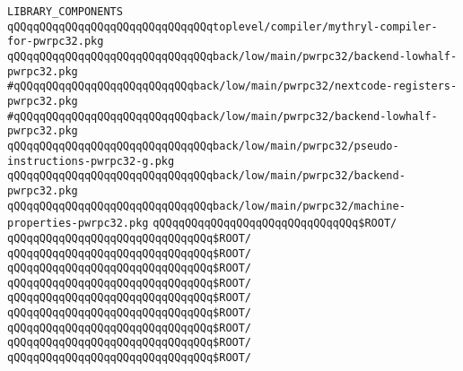 \verb|LIBRARY_COMPONENTS|\newline
\newline
\verb|qQQqqQQqqQQqqQQqqQQqqQQqqQQqqQQqtoplevel/compiler/mythryl-compiler-for-pwrpc32.pkg|\newline
\newline
\verb|qQQqqQQqqQQqqQQqqQQqqQQqqQQqqQQqback/low/main/pwrpc32/backend-lowhalf-pwrpc32.pkg|\newline
\verb|#qQQqqQQqqQQqqQQqqQQqqQQqqQQqback/low/main/pwrpc32/nextcode-registers-pwrpc32.pkg|\newline
\verb|#qQQqqQQqqQQqqQQqqQQqqQQqqQQqback/low/main/pwrpc32/backend-lowhalf-pwrpc32.pkg|\newline
\verb|qQQqqQQqqQQqqQQqqQQqqQQqqQQqqQQqback/low/main/pwrpc32/pseudo-instructions-pwrpc32-g.pkg|\newline
\verb|qQQqqQQqqQQqqQQqqQQqqQQqqQQqqQQqback/low/main/pwrpc32/backend-pwrpc32.pkg|\newline
\verb|qQQqqQQqqQQqqQQqqQQqqQQqqQQqqQQqback/low/main/pwrpc32/machine-properties-pwrpc32.pkg|\newline
\newline
\verb|qQQqqQQqqQQqqQQqqQQqqQQqqQQqqQQq$ROOT/|\newline
\verb|qQQqqQQqqQQqqQQqqQQqqQQqqQQqqQQq$ROOT/|\newline
\verb|qQQqqQQqqQQqqQQqqQQqqQQqqQQqqQQq$ROOT/|\newline
\verb|qQQqqQQqqQQqqQQqqQQqqQQqqQQqqQQq$ROOT/|\newline
\newline
\verb|qQQqqQQqqQQqqQQqqQQqqQQqqQQqqQQq$ROOT/|\newline
\verb|qQQqqQQqqQQqqQQqqQQqqQQqqQQqqQQq$ROOT/|\newline
\verb|qQQqqQQqqQQqqQQqqQQqqQQqqQQqqQQq$ROOT/|\newline
\verb|qQQqqQQqqQQqqQQqqQQqqQQqqQQqqQQq$ROOT/|\newline
\verb|qQQqqQQqqQQqqQQqqQQqqQQqqQQqqQQq$ROOT/|\newline
\verb|qQQqqQQqqQQqqQQqqQQqqQQqqQQqqQQq$ROOT/|\newline
\newline

